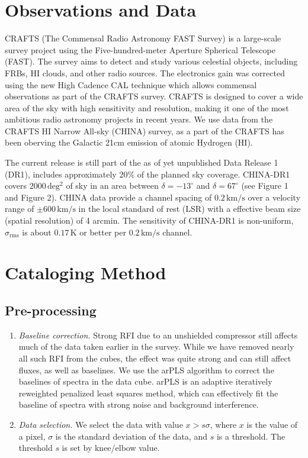 \documentclass[twocolumn,trackchanges]{aastex701}
\begin{document}
\section{Observations and Data}

CRAFTS (The Commensal Radio Astronomy FAST Survey) is a large-scale survey project using the Five-hundred-meter Aperture Spherical Telescope (FAST). The survey aims to detect and study various celestial objects, including FRBs, HI clouds, and other radio sources. The electronics gain was corrected using the new High Cadence CAL technique which allows commensal observations as part of the CRAFTS survey. CRAFTS is designed to cover a wide area of the sky with high sensitivity and resolution, making it one of the most ambitious radio astronomy projects in recent years. We use data from the CRAFTS HI Narrow All-sky (CHINA) survey, as a part of the CRAFTS has been oberving the Galactic 21cm emission of atomic Hydrogen (HI).

The current release is still part of the as of yet unpublished Data Release 1 (DR1), includes approximately 20\% of the planned sky coverage.
CHINA-DR1 covers $2000\,\mathrm{deg^2}$ of sky in an area between $\delta = -13^\circ$ and $\delta = 67^\circ$ (see Figure 1 and Figure 2). CHINA data provide a channel spacing of $0.2\,\mathrm{km/s}$ over a velocity range of $\pm 600\,\mathrm{km/s}$ in the local standard of rest (LSR) with a effective beam size (spatial resolution) of 4 arcmin. The sensitivity of CHINA-DR1 is non-uniform, $\sigma_{\mathrm{rms}}$ is about $0.17\,\mathrm{K}$ or better per $0.2\,\mathrm{km/s}$ channel.

\section{Cataloging Method}

\subsection{Pre-processing}

\begin{enumerate}
    \item \textit{Baseline correction.} Strong RFI due to an unshielded compressor still affects much of the data taken earlier in the survey. While we have removed nearly all such RFI from the cubes, the effect was quite strong and can still affect fluxes, as well as baselines. We use the arPLS algorithm to correct the baselines of spectra in the data cube. arPLS is an adaptive iteratively reweighted penalized least squares method, which can effectively fit the baseline of spectra with strong noise and background interference.
    \item \textit{Data selection.} We select the data with value $x > s\sigma$, where $x$ is the value of a pixel, $\sigma$ is the standard deviation of the data, and $s$ is a threshold. The threshold $s$ is set by knee/elbow value.
\end{enumerate}
\end{document}
